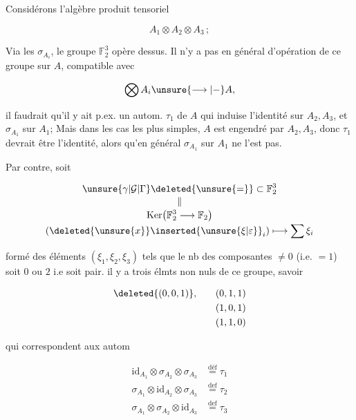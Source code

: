 
Considérons l'algèbre produit tensoriel 

\[
 A_1\otimes A_2\otimes A_3\,;
\]

Via les $\sigma_{A_i}$, le groupe $\mathbb F_2^3$ opère dessus. Il n'y a pas en général d'opération de ce groupe sur $A$, compatible avec

\[
 \bigotimes A_i\unsure{\longrightarrow|\mathord{-}}A,
\]

 il faudrait qu'il y ait p.ex. un autom. $\tau_1$ de $A$ qui induise  l'identité sur $A_2,A_3$, et $\sigma_{A_1}$ sur $A_1$; Mais dans les cas les plus simples, $A$ est engendré par $A_2,A_3$, donc $\tau_1$ devrait être l'identité, alors qu'en général $\sigma_{A_1}$ sur $A_1$ ne l'est pas.

Par contre, soit

\[
 \begin{gathered}
 \unsure{\gamma|\mathcal G|\Gamma}\deleted{\unsure{=}}\subset\mathbb F_2^3\\[-2pt]
 \Vert\\[-2pt]
 \operatorname{Ker}\bigl(\mathbb F_2^3\longrightarrow\mathbb F_2\bigr)\\[-2pt]
 (\deleted{\unsure{x}}\inserted{\unsure{\xi|\varepsilon}}_i)\longmapsto\sum\xi_i
 \end{gathered}
\]

formé des éléments $(\xi_1,\xi_2,\xi_3)$ tels que le nb des composantes $\ne0$ (i.e. $=1$) soit $0$ ou $2$ i.e soit pair.  il y  a trois élmts non nuls de ce groupe, savoir

\[
 \begin{aligned}
 \deleted{(0,0,1)},\qquad &(0,1,1)\\
 &(1,0,1)\\
 &(1,1,0)
 \end{aligned}
\]

qui correspondent aux autom

\[
 \begin{aligned}
 \mathrm{id}_{A_1}\otimes\sigma_{A_2}\otimes\sigma_{A_3}&\overset{\text{déf}}{=}\tau_1\\
 \sigma_{A_1}\otimes\mathrm{id}_{A_2}\otimes\sigma_{A_3}&\overset{\text{def}}{=}\tau_2\\
 \sigma_{A_1}\otimes\sigma_{A_2}\otimes\mathrm{id}_{A_3}&\overset{\text{def}}{=}\tau_3
 \end{aligned}
\]

